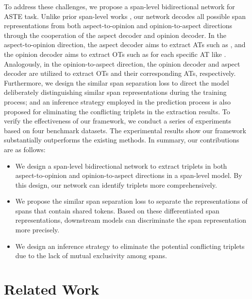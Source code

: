 \documentclass[11pt]{article}
\begin{document}
To address these challenges, we propose a span-level bidirectional network for ASTE task. Unlike prior span-level works \cite{DBLP:conf/acl/XuCB20}, our network decodes all possible span representations from both aspect-to-opinion and opinion-to-aspect directions through the cooperation of the aspect decoder and opinion decoder. In the aspect-to-opinion direction, the aspect decoder aims to extract ATs such as , and the opinion decoder aims to extract OTs such as  for each specific AT like . Analogously, in the opinion-to-aspect direction, the opinion decoder and aspect decoder are utilized to extract OTs and their corresponding ATs, respectively. Furthermore, we design the similar span separation loss to direct the model deliberately distinguishing similar span representations during the training process; and an inference strategy employed in the prediction process is also proposed for eliminating the conflicting triplets in the extraction results. To verify the effectiveness of our framework, we conduct a series of experiments based on four benchmark datasets. The experimental results show our framework substantially outperforms the existing methods. In summary, our contributions are as follows:
\begin{itemize}
	
	\item We design a span-level bidirectional network to extract triplets in both aspect-to-opinion and opinion-to-aspect directions in a span-level model. By this design, our network can identify triplets more comprehensively.
	
	\item We propose the similar span separation loss to separate the representations of spans that contain shared tokens. Based on these differentiated span representations, downstream models can discriminate the span representation more precisely.
	
	\item We design an inference strategy to eliminate the potential conflicting triplets due to the lack of mutual exclusivity among spans.
\end{itemize}

\section{Related Work}
\end{document}
